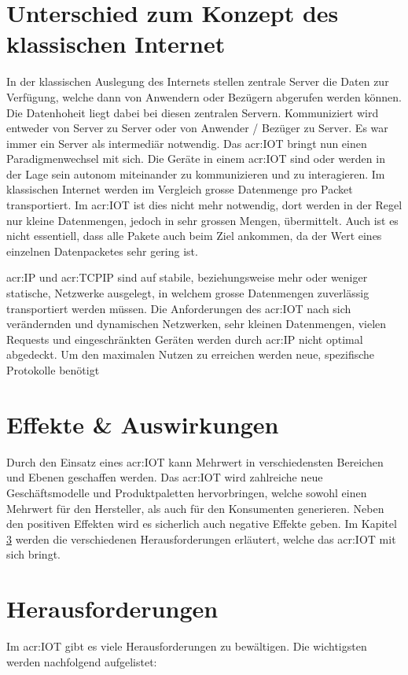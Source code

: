 \section{Unterschied zum Konzept des klassischen Internet}
In der klassischen Auslegung des Internets stellen zentrale Server die Daten zur Verfügung, welche dann von Anwendern oder Bezügern abgerufen werden können. Die Datenhoheit liegt dabei bei diesen zentralen Servern. Kommuniziert wird entweder von Server zu Server oder von Anwender / Bezüger zu Server. Es war immer ein Server als intermediär notwendig. Das \gls{acr:IOT} bringt nun einen Paradigmenwechsel mit sich. Die Geräte in einem \gls{acr:IOT} sind oder werden in der Lage sein autonom miteinander zu kommunizieren und zu interagieren. Im klassischen Internet werden im Vergleich grosse Datenmenge pro Packet transportiert. Im \gls{acr:IOT} ist dies nicht mehr notwendig, dort werden in der Regel nur kleine Datenmengen, jedoch in sehr grossen Mengen, übermittelt. Auch ist es nicht essentiell, dass alle Pakete auch beim Ziel ankommen, da der Wert eines einzelnen Datenpacketes	 sehr gering ist.


\gls{acr:IP} und \gls{acr:TCPIP} sind auf stabile, beziehungsweise mehr oder weniger statische, Netzwerke ausgelegt, in welchem grosse Datenmengen zuverlässig transportiert werden müssen. Die Anforderungen des \gls{acr:IOT} nach sich verändernden und dynamischen Netzwerken, sehr kleinen Datenmengen, vielen Requests und eingeschränkten Geräten werden durch \gls{acr:IP} nicht optimal abgedeckt. Um den maximalen Nutzen zu erreichen werden neue, spezifische Protokolle benötigt

\section{Effekte \& Auswirkungen}

Durch den Einsatz eines \gls{acr:IOT} kann Mehrwert in verschiedensten Bereichen und Ebenen geschaffen werden. Das \gls{acr:IOT} wird zahlreiche neue Geschäftsmodelle und Produktpaletten hervorbringen, welche sowohl einen Mehrwert für den Hersteller, als auch für den Konsumenten generieren. Neben den positiven Effekten wird es sicherlich auch negative Effekte geben. Im Kapitel \ref{sec:DomainIoT:Challenges}  werden die verschiedenen Herausforderungen erläutert, welche das \gls{acr:IOT} mit sich bringt. 


\section{Herausforderungen} \label{sec:DomainIoT:Challenges}
Im \gls{acr:IOT} gibt es viele Herausforderungen zu bewältigen. Die wichtigsten werden nachfolgend aufgelistet:

